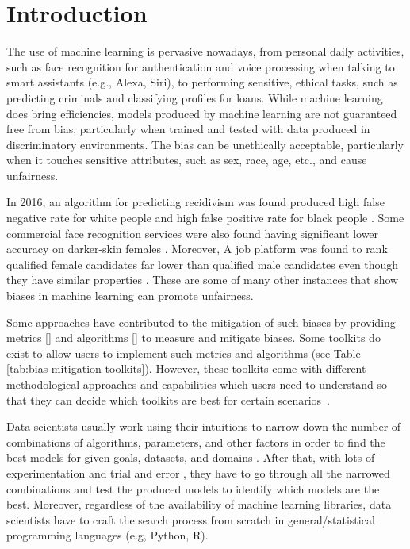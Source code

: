 \documentclass[sigconf,review]{acmart}
\begin{document}
\maketitle

\section{Introduction}
\label{sec:introduction}
The use of machine learning is pervasive nowadays, from personal daily activities, such as face recognition for authentication and voice processing when talking to smart assistants (e.g., Alexa, Siri), to performing sensitive, ethical tasks, such as predicting criminals and classifying profiles for loans. While machine learning does bring efficiencies, models produced by machine learning are not guaranteed free from bias, particularly when trained and tested with data produced in discriminatory environments. The bias can be unethically acceptable, particularly when it touches sensitive attributes, such as sex, race, age, etc., and cause unfairness. 

In 2016, an algorithm for predicting recidivism was found produced high false negative rate for white people and high false positive rate for black people \cite{angwin2016machine}. Some commercial face recognition services were also found having significant lower accuracy on darker-skin females \cite{buolamwini2018gender}. Moreover, A job platform was found to rank qualified female candidates far lower than qualified male candidates even though they have similar properties \cite{lahoti2019ifair}. These are some of many other instances that show biases in machine learning can promote unfairness. 

Some approaches have contributed to the mitigation of such biases by providing metrics []  and algorithms [] to measure and mitigate biases. Some toolkits do exist to allow users to implement such metrics and algorithms (see Table \ref{tab:bias-mitigation-toolkits}).
However, these toolkits come with different methodological approaches and capabilities which users need to understand so that they can decide which toolkits are best for certain scenarios~\cite{lee2021landscape}.  

Data scientists usually work using their intuitions to narrow down the number of combinations of algorithms, parameters, and other factors in order to find the best models for given goals, datasets, and domains \cite{muller2016introduction}. After that, with lots of experimentation and trial and error \cite{byrne2017development}, they have to go through all the narrowed combinations and test the produced models to identify which models are the best. Moreover, regardless of the availability of machine learning libraries, data scientists have to craft the search process from scratch in general/statistical programming languages (e.g, Python, R).
\end{document}
